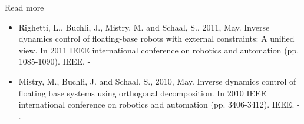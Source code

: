 \documentclass{beamer}
\begin{document}
\begin{frame}{Read more}
	
	\begin{itemize}
		
		\item Righetti, L., Buchli, J., Mistry, M. and Schaal, S., 2011, May. Inverse dynamics control of floating-base robots with external constraints: A unified view. In 2011 IEEE international conference on robotics and automation (pp. 1085-1090). IEEE. - 
		
		\item Mistry, M., Buchli, J. and Schaal, S., 2010, May. Inverse dynamics control of floating base systems using orthogonal decomposition. In 2010 IEEE international conference on robotics and automation (pp. 3406-3412). IEEE. - .
	\end{itemize}
	
\end{frame}



\myqrframe
\end{document}
